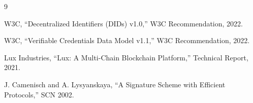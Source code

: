 \documentclass[11pt,twocolumn]{article}
\begin{document}

\begin{thebibliography}{9}

W3C, ``Decentralized Identifiers (DIDs) v1.0,'' W3C Recommendation, 2022.

W3C, ``Verifiable Credentials Data Model v1.1,'' W3C Recommendation, 2022.

Lux Industries, ``Lux: A Multi-Chain Blockchain Platform,'' Technical Report, 2021.

J. Camenisch and A. Lysyanskaya, ``A Signature Scheme with Efficient Protocols,'' SCN 2002.

\end{thebibliography}
\end{document}
